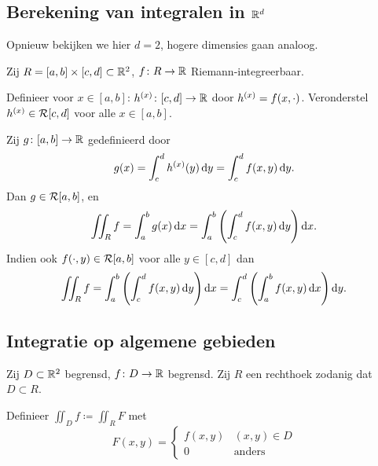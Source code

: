 \documentclass{2wa40summary}
\begin{document}
		\subsection{Berekening van integralen in $\mathbb{R}^d$}
			Opnieuw bekijken we hier $d=2$, hogere dimensies gaan analoog.
			\begin{theorem}
				Zij $R=[a,b]\times[c,d] \subset \mathbb{R}^2$, $f\colon R\to\mathbb{R}$ Riemann-integreerbaar.
				
				Definieer voor $x \in [a,b]$: $h^{(x)} \colon [c,d] \to \mathbb{R}$ door $h^{(x)} = f(x,\cdot)$. Veronderstel $h^{(x)} \in \mathcal{R} [c,d]$ voor alle $x \in [a,b]$. 
				
				Zij $g \colon [a,b] \to \mathbb{R}$ gedefinieerd door
				\[ 
					g(x) = \int_c^d h^{(x)} (y) \mathop{}\!\mathrm{d} y = \int_c^d f(x,y) \mathop{}\!\mathrm{d} y.
				 \]
				 Dan $g\in \mathcal{R} [a,b]$, en \[ \iint_R f = \int_a^b g(x) \mathop{}\!\mathrm{d} x = \int_a^b \left( \int_c^d f(x,y)\mathop{}\!\mathrm{d} y  \right) \mathop{}\!\mathrm{d} x. \]
				 \opm Indien ook $f(\cdot,y) \in \mathcal{R} [a,b]$ voor alle $y \in [c,d]$ dan 
				 \[ 
					 \iint_R f  =  \int_a^b \left( \int_c^d f(x,y)\mathop{}\!\mathrm{d} y  \right) \mathop{}\!\mathrm{d} x =  \int_c^d \left( \int_a^b f(x,y)\mathop{}\!\mathrm{d} x  \right) \mathop{}\!\mathrm{d} y.
				  \]
			\end{theorem}
			
		\subsection{Integratie op algemene gebieden}
			\begin{define}
				Zij $D \subset \mathbb{R}^2$ begrensd, $f \colon D \to  \mathbb{R}$ begrensd. Zij $R$ een rechthoek zodanig dat $D \subset R$.
				
				Definieer $\iint_D f \coloneqq  \iint_R F$ met 
				\[ 
					F(x,y) = 
					\begin{cases}
						f(x,y) & (x,y) \in D \\
						0 & \text{anders}
					\end{cases}
				\]
			\end{define}
			
\end{document}
